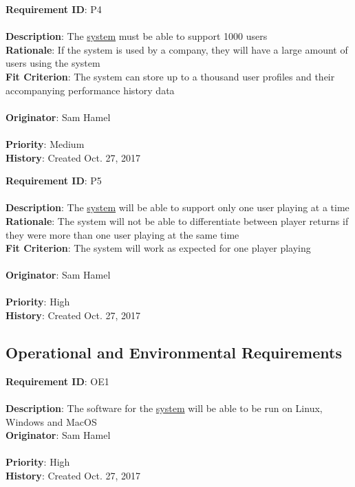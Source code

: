 \documentclass[11pt]{article}
\begin{document}
\begin{framed}
	\noindent\textbf{Requirement ID}: P4 \hfill\\\\
	\noindent\textbf{Description}: The \hyperref[sec:definitions]{system} must be able to support 1000 users \\
	\textbf{Rationale}: If the system is used by a company, they will have a large amount of users using the system\\
	\textbf{Fit Criterion}: The system can store up to a thousand user profiles and their accompanying performance history data \\\\
	\textbf{Originator}: Sam Hamel \\\\
	\textbf{Priority}: Medium \hfill \\
	\noindent\textbf{History}: Created Oct. 27, 2017
\end{framed}

\begin{framed}
	\noindent\textbf{Requirement ID}: P5 \\\\
	\noindent\textbf{Description}: The \hyperref[sec:definitions]{system} will be able to support only one user playing at a time \\
	\textbf{Rationale}: The system will not be able to differentiate between player returns if they were more than one user playing at the same time \\
	\textbf{Fit Criterion}: The system will work as expected for one player playing \\\\
	\textbf{Originator}: Sam Hamel \\\\
	\textbf{Priority}: High \hfill \\
	\noindent\textbf{History}: Created Oct. 27, 2017
\end{framed}

\subsection{Operational and Environmental Requirements}
\begin{framed}
	\noindent\textbf{Requirement ID}: OE1 \hfill\\\\
	\noindent\textbf{Description}: The software for the \hyperref[sec:definitions]{system} will be able to be run on Linux, Windows and MacOS \\
	\textbf{Originator}: Sam Hamel \\\\
	\textbf{Priority}: High \hfill \\
	\noindent\textbf{History}: Created Oct. 27, 2017
\end{framed}
\end{document}
